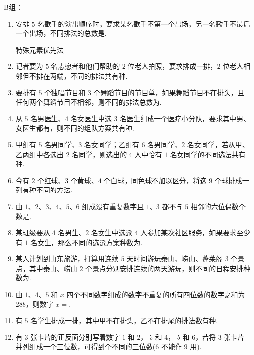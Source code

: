 B组：
\begin{enumerate}
\item 安排 $5$ 名歌手的演出顺序时，要求某名歌手不第一个出场，另一名歌手不最后一个出场，不同排法的总数是.
\begin{jieda}
    特殊元素优先法
\end{jieda}

\item 记者要为 $5$ 名志愿者和他们帮助的 $2$ 位老人拍照，要求排成一排，$2$ 位老人相邻但不排在两端，不同的排法共有种.

\item 要排有 $5$ 个独唱节目和 $3$ 个舞蹈节目的节目单，如果舞蹈节目不在排头，且任何两个舞蹈节目不相邻，则不同的排法总数为.

\item 从 $5$ 名男医生、$4$ 名女医生中选 $3$ 名医生组成一个医疗小分队，要求其中男、女医生都有，则不同的组队方案共有种.

\item 甲组有 $5$ 名男同学、$3$ 名女同学；乙组有 $6$ 名男同学、$2$ 名女同学，若从甲、乙两组中各选出 $2$ 名同学，则选出的 $4$ 人中恰有 $1$ 名女同学的不同选法共有种.

\item 今有 $2$ 个红球、$3$ 个黄球、$4$ 个白球，同色球不加以区分，将这 $9$ 个球排成一列有种不同的方法.

\item 由 $1$、$2$、$3$、$4$、$5$、$6$ 组成没有重复数字且 $1$、$3$ 都不与 $5$ 相邻的六位偶数个数是.

\item 某班级要从 $4$ 名男生、$2$ 名女生中选派 $4$ 人参加某次社区服务，如果要求至少有 $1$ 名女生，那么不同的选派方案种数为.


\item 某人计划到山东旅游，打算用连续 $5$ 天时间游玩泰山、崂山、蓬莱阁 $3$ 个景点，其中泰山、崂山 $2$ 个景点分别安排连续的两天游玩，则不同的日程安排种数为.

\item 由 $1$、$4$、$5$ 和 $x$ 四个不同数字组成的数字不重复的所有四位数的数字之和为 $288$，则数字 $x=$.

\item 有 $5$ 名学生排成一排，其中甲不在排头，乙不在排尾的排法数有种.

\item 有 $3$ 张卡片的正反面分别写着数字 $1$ 和 $2$， $3$ 和 $4$， $5$ 和 $6$，若将 $3$ 张卡片并列组成一个三位数，可得到个不同的三位数($6$ 不能作 $9$ 用).


\end{enumerate}
